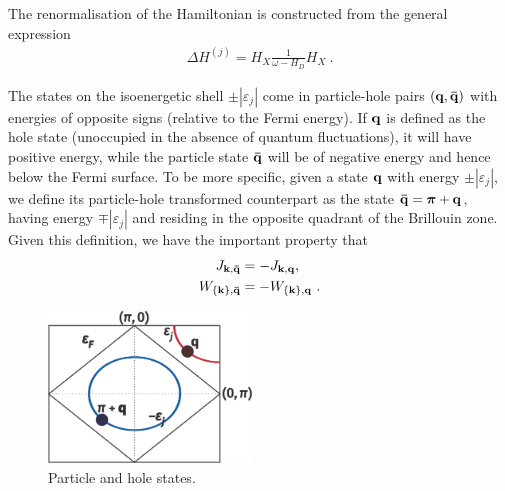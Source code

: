 \documentclass{revtex4-2}
\begin{document}
The renormalisation of the Hamiltonian is constructed from the general expression
\begin{equation}\begin{aligned}
	\Delta H^{(j)} = H_X \frac{1}{\omega- H_D} H_X~.
\end{aligned}\end{equation}

The states on the isoenergetic shell \(\pm|\varepsilon_j|\) come in particle-hole pairs \(\left( {\bf q}, {\bf \bar q} \right) \) with energies of opposite signs (relative to the Fermi energy). If \({\bf q}\) is defined as the hole state (unoccupied in the absence of quantum fluctuations), it will have positive energy, while the particle state \({\bf \bar q}\) will be of negative energy and hence below the Fermi surface. To be more specific, given a state \({\bf q}\) with energy \(\pm|\varepsilon_j|\), we define its particle-hole transformed counterpart as the state \({\bf \bar q} = \boldsymbol{\pi} + {\bf q}\), having energy \(\mp|\varepsilon_j|\) and residing in the opposite quadrant of the Brillouin zone. Given this definition, we have the important property that
\begin{equation}\begin{aligned}\label{particleHoleRelation}
	J_{{\bf k}, {\bf \bar q}} &= -J_{{\bf k}, {\bf q}},\\
	W_{\left\{{\bf k}\right\}, {\bf \bar q}} &= -W_{\left\{{\bf k}\right\}, {\bf q}}~.
\end{aligned}\end{equation}

\begin{figure}[htpb]
	\centering
	\includegraphics[width=0.48\textwidth]{particleHoleRelation.pdf}
	\caption{Particle and hole states.}
	\label{fig:particleHoleRelation-pdf}
\end{figure}
\end{document}
